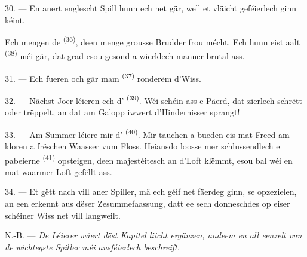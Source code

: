 30. --- En anert englescht Spill hunn ech net gär, well et vläicht geféierlech ginn
kéint.

Ech mengen de  \textsuperscript{(36)}, deen menge grousse Brudder
frou mécht. Ech hunn eist aalt  \textsuperscript{(38)} méi gär, dat
grad esou gesond a wierklech manner brutal ass.

\VUsaut{4.6mm}
\VUsaut{3.0mm}

31. --- Ech fueren och gär mam  \textsuperscript{(37)} ronderëm d'Wiss.

32. --- Nächst Joer léieren ech d' \textsuperscript{(39)}. Wéi schéin
ass e Päerd, dat zierlech schrëtt oder trëppelt, an dat am Galopp iwwert
d'Hindernisser sprangt!

33. --- Am Summer léiere mir d' \textsuperscript{(40)}. Mir
tauchen a bueden eis mat Freed am kloren a frëschen Waasser vum Floss. Heiansdo
loosse mer schlussendlech e pabeierne  \textsuperscript{(41)}
opsteigen, deen majestéitesch an d'Loft klëmmt, esou bal wéi en mat waarmer Loft
gefëllt ass.

34. --- Et gëtt nach vill aner Spiller, mä ech géif net fäerdeg ginn, se opzezielen,
an een erkennt aus dëser Zesummefaassung, datt ee sech donneschdes op eiser schéiner
Wiss net vill langweilt.

N.-B. --- \textit{De Léierer wäert dëst Kapitel liicht ergänzen, andeem en all eenzelt
vun de wichtegste Spiller méi ausféierlech beschreift.}
